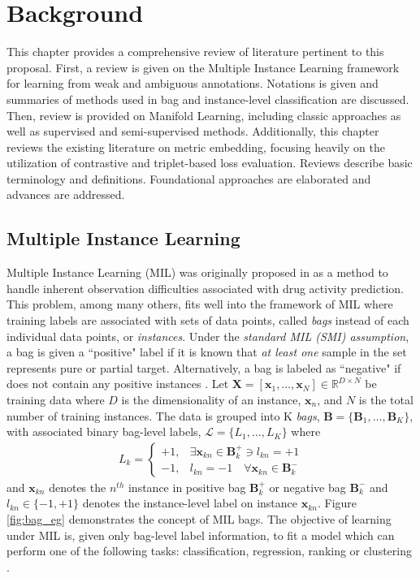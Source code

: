 \chapter{Background}

This chapter provides a comprehensive review of literature pertinent to this proposal.  First, a review is given on the Multiple Instance Learning framework for learning from weak and ambiguous annotations.  Notations is given and summaries of methods used in bag and instance-level classification are discussed.  Then, review is provided on Manifold Learning, including classic approaches as well as supervised and semi-supervised methods. Additionally, this chapter reviews the existing literature on metric embedding, focusing heavily on the utilization of contrastive and triplet-based loss evaluation.  Reviews describe basic terminology and definitions.  Foundational approaches are elaborated and advances are addressed.

\section{Multiple Instance Learning}

Multiple Instance Learning (MIL) was originally proposed in \citep{Dietterich1996AxisParallelRectangles} as a method to handle inherent observation difficulties associated with drug activity prediction.  This problem, among many others, fits well into the framework of MIL where training labels are associated with sets of data points, called \textit{bags} instead of each individual data points, or \textit{instances}.  Under the \textit{standard MIL (SMI) assumption}, a bag is given a ``positive" label if it is known that  \textit{at least one} sample in the set represents pure or partial target.  Alternatively, a bag is labeled as ``negative" if does not contain any positive instances \citep{Carbonneau2016MILSurvey}.  Let $\bm{X}=[\bm{x}_1,\dots, \bm{x}_N] \in \mathbb{R}^{D \times N}$ be training data where $D$ is the dimensionality of an instance, $\bm{x}_n$, and $N$ is the total number of training instances.  The data is grouped into K \textit{bags}, $\bm{B} = \{\bm{B}_1, \dots, \bm{B}_K\}$, with associated binary bag-level labels, $\mathcal{L} = \{L_1, \dots, L_K \}$ where 
\begin{align}
	L_k = \begin{cases} 
	+1, & \exists \bm{x}_{kn} \in \bm{B}^{+}_{k} \ni  l_{kn} = +1\\
	-1, & l_{kn} = -1 \quad \forall \bm{x}_{kn} \in \bm{B}^{-}_{k} 
	\end{cases}
\end{align} and $\bm{x}_{kn}$ denotes the $n^{th}$ instance in positive bag $\bm{B}^{+}_{k}$ or negative bag $\bm{B}^{-}_{k}$ \citep{Zare2016MIACE} and $l_{kn} \in \{ -1, +1\}$ denotes the instance-level label on instance $\bm{x}_{kn}$.  Figure \ref{fig:bag_eg} demonstrates the concept of MIL bags.  The objective of learning under MIL is, given only bag-level label information, to fit a model which can perform one of the following tasks: classification, regression, ranking or clustering \citep{Carbonneau2016MILSurvey}.

